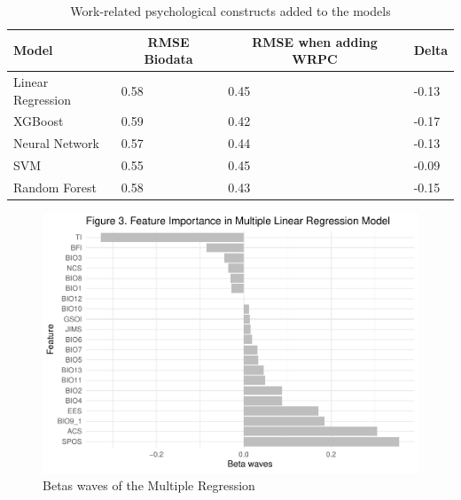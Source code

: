 \documentclass[
  man]{apa7}
\begin{document}
\begin{table}[tbp]

\begin{center}
\begin{threeparttable}

\caption{\label{tab:deltas2}Work-related psychological constructs added to the models}

\begin{tabular}{llll}
\toprule
Model & \multicolumn{1}{c}{RMSE Biodata} & \multicolumn{1}{c}{RMSE when adding WRPC} & \multicolumn{1}{c}{Delta}\\
\midrule
Linear Regression & 0.58 & 0.45 & -0.13\\
XGBoost & 0.59 & 0.42 & -0.17\\
Neural Network & 0.57 & 0.44 & -0.13\\
SVM & 0.55 & 0.45 & -0.09\\
Random Forest & 0.58 & 0.43 & -0.15\\
\bottomrule
\end{tabular}

\end{threeparttable}
\end{center}

\end{table}

\begin{figure}
\centering
\includegraphics{dissertation_files/figure-latex/coefbg2-1.pdf}
\caption{\label{fig:coefbg2}Betas waves of the Multiple Regression}
\end{figure}
\end{document}

